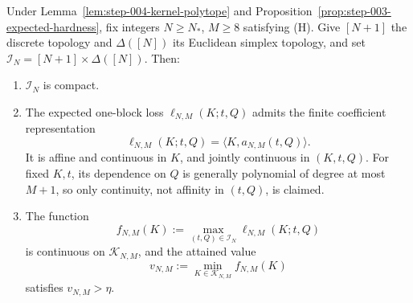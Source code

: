 \begin{lemma}\label{lem:step-004-payoff-value}
Under Lemma~\ref{lem:step-004-kernel-polytope} and Proposition~\ref{prop:step-003-expected-hardness}, fix integers
\(N\ge N_*\), \(M\ge8\) satisfying (H). Give \([N+1]\) the discrete
topology and \(\Delta([N])\) its Euclidean simplex topology, and set
\(\mathcal I_N=[N+1]\times\Delta([N])\). Then:

\begin{enumerate}
\item \(\mathcal I_N\) is compact.
\item The expected one-block loss \(\ell_{N,M}(K;t,Q)\) admits the finite
   coefficient representation
   \[
   \ell_{N,M}(K;t,Q)=\langle K,a_{N,M}(t,Q)\rangle.
   \]
   It is affine and
   continuous in \(K\), and jointly continuous in \((K,t,Q)\). For fixed
   \(K,t\), its dependence on \(Q\) is generally polynomial of degree at
   most \(M+1\), so only continuity, not affinity in \((t,Q)\), is claimed.
\item The function
   \[
   f_{N,M}(K):=\max_{(t,Q)\in\mathcal I_N}
      \ell_{N,M}(K;t,Q)
   \]
   is continuous on \(\mathcal K_{N,M}\), and the attained value
   \[
   v_{N,M}:=\min_{K\in\mathcal K_{N,M}}f_{N,M}(K)
   \tag{8}
   \]
   satisfies \(v_{N,M}>\eta\).
\end{enumerate}
\end{lemma}

